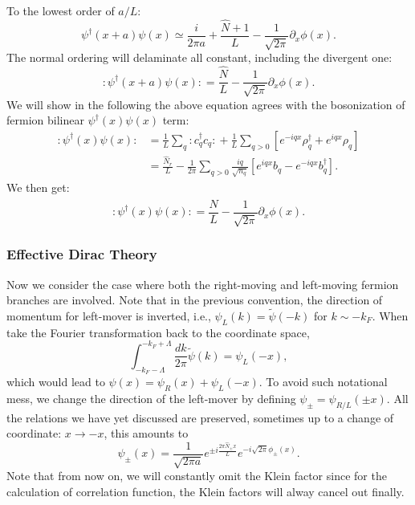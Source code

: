 To the lowest order of $a/L$: 
\begin{equation}
	\psi^\dagger(x+a)\psi(x) \simeq \frac{i}{2\pi a} + \frac{\hat N+1}{L} - \frac{1}{\sqrt{2\pi}}\partial_x\phi(x).
\end{equation}
The normal ordering will delaminate all constant, including the divergent one:
\begin{equation}
	{:\mathrel{\psi^\dagger(x+a)\psi(x)}:}
	= \frac{\hat N}{L} - \frac{1}{\sqrt{2\pi}}\partial_x\phi(x).
\end{equation}
We will show in the following the above equation agrees with the bosonization of fermion bilinear $\psi^\dagger(x)\psi(x)$ term:
\begin{equation}
\begin{aligned}
	{:\mathrel{\psi^\dagger(x)\psi(x)}:}
	&= \frac{1}{L}\sum_{q} {:\mathrel{c_{q}^\dagger c_{q}}:} + \frac{1}{L}\sum_{q>0}[e^{-iqx}\rho^\dagger_{q}+e^{iqx}\rho_{q}] \\
	&= \frac{\hat N_r}{L} - \frac{1}{2\pi} \sum_{q>0} \frac{iq}{\sqrt{n_q}} \left[e^{iqx}b_{q} - e^{-iqx}b^\dagger_{q}\right].
\end{aligned}
\end{equation}
We then get:
\begin{equation}
	{:\mathrel{\psi^\dagger(x)\psi(x)}:}
	= \frac{\hat N}{L} - \frac{1}{\sqrt{2\pi}} \partial_x \phi(x).
\end{equation}

\subsubsection*{Effective Dirac Theory}
Now we consider the case where both the right-moving and left-moving fermion branches are involved.
Note that in the previous convention, the direction of momentum for left-mover is inverted, i.e., $\psi_L(k) = \tilde\psi(-k)$ for $k \sim -k_F$.
When take the Fourier transformation back to the coordinate space,
\begin{equation}
	\int_{-k_F-\Lambda}^{-k_F+\Lambda} \frac{dk}{2\pi} \tilde\psi(k) = \psi_L(-x),
\end{equation}
which would lead to $\psi(x) = \psi_R(x)+\psi_L(-x)$. 
To avoid such notational mess, we change the direction of the left-mover by defining $\psi_{\pm} = \psi_{R/L}(\pm x)$.
All the relations we have yet discussed are preserved, sometimes up to a change of coordinate: $x \rightarrow -x$, this amounts to 
\begin{equation}
	\psi_{\pm}(x) = \frac{1}{\sqrt{2\pi a}}e^{\pm i\frac{2\pi\hat N_{\pm} x}{L}}e^{-i\sqrt{2\pi}\phi_{\pm}(x)}.
\end{equation}
Note that from now on, we will constantly omit the Klein factor since for the calculation of correlation function, the Klein factors will alway cancel out finally.

